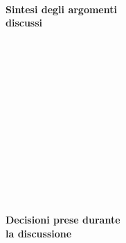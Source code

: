 \documentclass[10pt, a4paper]{article}
\title{\data}
\author{SWEetCode}
\begin{document}


\setlength{\parindent}{0mm}
\setlength{\columnsep}{2.2em}
\setlength{\columnseprule}{4pt}
\begin{paracol}{2}


\intestazione
\vspace{14.2em}

\partecipanti

\newpage

\switchcolumn
\revisioneAzioni
\vspace{11.4em}

\ordineGiorno

\newpage


\switchcolumn

\\
\textbf{Sintesi degli argomenti\\discussi}


\newpage
~\\\\\\\\\\\\\\\\\\\\~

\\
\textbf{Decisioni prese durante\\la discussione}

\switchcolumn

\discussione
~\\\\\\\\\\\\\\~
\decisioni

\end{paracol}

\vspace{5em}
\end{document}
